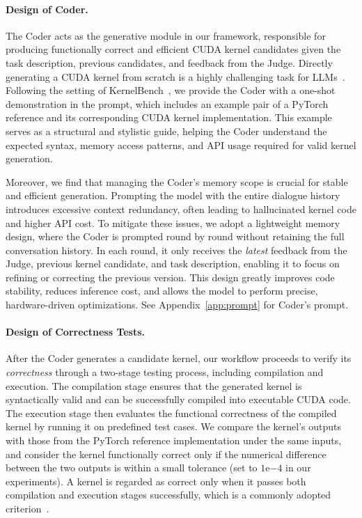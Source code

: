 \paragraph{Design of Coder.} 
The {Coder} acts as the generative module in our framework, responsible for producing functionally correct and efficient CUDA kernel candidates given the task description, previous candidates, and feedback from the Judge. 
Directly generating a CUDA kernel from scratch is a highly challenging task for LLMs~\citep{ouyang2025kernelbenchllmswriteefficient}. 
Following the setting of KernelBench~\citep{ouyang2025kernelbenchllmswriteefficient}, we provide the Coder with a {one-shot demonstration} in the prompt, which includes an example pair of a PyTorch reference and its corresponding CUDA kernel implementation. 
This example serves as a structural and stylistic guide, helping the Coder understand the expected syntax, memory access patterns, and API usage required for valid kernel generation.

Moreover, we find that managing the Coder’s {memory scope} is crucial for stable and efficient generation. 
Prompting the model with the entire dialogue history introduces excessive context redundancy, often leading to hallucinated kernel code and higher API cost. 
To mitigate these issues, we adopt a {lightweight memory} design, where the Coder is prompted round by round without retaining the full conversation history. 
In each round, it only receives the {\it latest} feedback from the Judge, previous kernel candidate, and task description, enabling it to focus on refining or correcting the previous version. 
This design greatly improves code stability, reduces inference cost, and allows the model to perform precise, hardware-driven optimizations. See Appendix~\ref{app:prompt} for Coder's prompt.
\vspace{-8pt}
\paragraph{Design of Correctness Tests.} 
After the Coder generates a candidate kernel, our workflow proceeds to verify its {\it correctness} 
through a two-stage {testing process}, including {compilation} and {execution}. 
The compilation stage ensures that the generated kernel is syntactically valid and can be successfully compiled into executable CUDA code. 
The execution stage then evaluates the functional correctness of the compiled kernel by running it on predefined test cases. 
We compare the kernel’s outputs with those from the PyTorch reference implementation under the same inputs, and consider the kernel {functionally correct} only if the numerical difference between the two outputs is within a small tolerance (set to $1\text{e}{-4}$ in our experiments). 
A kernel is regarded as {correct} only when it passes both compilation and execution stages successfully, which is a commonly adopted criterion~\citep{kevin-multi-turn-rl,lange2025robustagenticcudakernel,ouyang2025kernelbenchllmswriteefficient}.
\vspace{-8pt}
